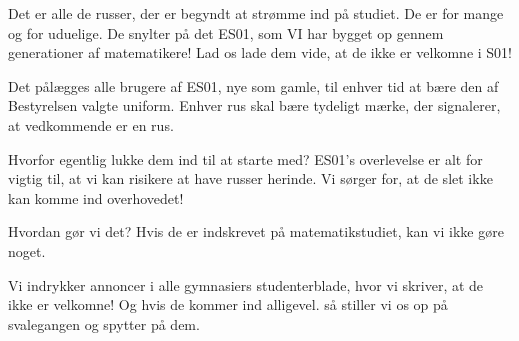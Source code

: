 \documentclass[a4paper,11pt]{article}
\begin{document}
\begin{sketch}

 Det er alle de russer, der er begyndt at strømme ind på studiet. De er for mange og for uduelige. De snylter på det ES01, som VI har bygget op gennem generationer af matematikere! Lad os lade dem vide, at de ikke er velkomne i S01!

  Det pålægges alle brugere af ES01, nye som gamle, til enhver tid at bære den af Bestyrelsen valgte uniform.  Enhver rus skal bære tydeligt mærke, der signalerer, at vedkommende er en rus. 



 Hvorfor egentlig lukke dem ind til at starte med?   ES01's overlevelse er alt for vigtig til, at vi kan risikere at have russer herinde. Vi sørger for, at de slet ikke kan komme ind overhovedet!


 Hvordan gør vi det? Hvis de er indskrevet på matematikstudiet, kan vi ikke gøre noget.


 Vi indrykker annoncer i alle gymnasiers studenterblade, hvor vi skriver, at de ikke er velkomne! Og hvis de kommer ind alligevel. så stiller vi os op på svalegangen og spytter på dem.


\end{sketch}
\end{document}
